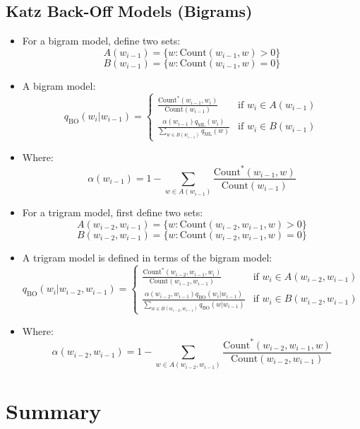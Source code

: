 \documentclass{book}
\begin{document}
\subsection{Katz Back-Off Models (Bigrams)}
    \begin{itemize}
        \item For a bigram model, define two sets:
        \[
        A(w_{i-1}) = \{w : \text{Count}(w_{i-1}, w) > 0\}
        \]
        \[
        B(w_{i-1}) = \{w : \text{Count}(w_{i-1}, w) = 0\}
        \]
        \item A bigram model:
        \[
        q_{\text{BO}}(w_i | w_{i-1}) =
        \begin{cases}
            \frac{\text{Count}^*(w_{i-1}, w_i)}{\text{Count}(w_{i-1})} & \text{if } w_i \in A(w_{i-1}) \\
            \frac{\alpha(w_{i-1}) q_{\text{ML}}(w_i)}{\sum_{w \in B(w_{i-1})} q_{\text{ML}}(w)} & \text{if } w_i \in B(w_{i-1})
        \end{cases}
        \]
        \item Where:
        \[
        \alpha(w_{i-1}) = 1 - \sum_{w \in A(w_{i-1})} \frac{\text{Count}^*(w_{i-1}, w)}{\text{Count}(w_{i-1})}
        \]
        \item For a trigram model, first define two sets:
        \[
        A(w_{i-2}, w_{i-1}) = \{w : \text{Count}(w_{i-2}, w_{i-1}, w) > 0\}
        \]
        \[
        B(w_{i-2}, w_{i-1}) = \{w : \text{Count}(w_{i-2}, w_{i-1}, w) = 0\}
        \]
        \item A trigram model is defined in terms of the bigram model:
        \[
        q_{\text{BO}}(w_i | w_{i-2}, w_{i-1}) =
        \begin{cases}
            \frac{\text{Count}^*(w_{i-2}, w_{i-1}, w_i)}{\text{Count}(w_{i-2}, w_{i-1})} & \text{if } w_i \in A(w_{i-2}, w_{i-1}) \\
            \frac{\alpha(w_{i-2}, w_{i-1}) q_{\text{BO}}(w_i|w_{i-1})}{\sum_{w \in B(w_{i-2}, w_{i-1})} q_{\text{BO}}(w|w_{i-1})} & \text{if } w_i \in B(w_{i-2}, w_{i-1})
        \end{cases}
        \]
        \item Where:
        \[
        \alpha(w_{i-2}, w_{i-1}) = 1 - \sum_{w \in A(w_{i-2}, w_{i-1})} \frac{\text{Count}^*(w_{i-2}, w_{i-1}, w)}{\text{Count}(w_{i-2}, w_{i-1})}
        \]
    \end{itemize}
    
  


\section{Summary}
 
\end{document}
